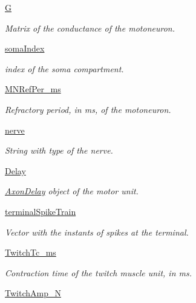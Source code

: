 \begin{DoxyCompactItemize}
\hyperlink{class_motor_unit_1_1_motor_unit_a9b9f157ab92b47470ca7ec6bd3473dd3}{G}
\begin{DoxyCompactList}\small\item\em Matrix of the conductance of the motoneuron. \end{DoxyCompactList}\item 
\hyperlink{class_motor_unit_1_1_motor_unit_a7cd2be92814b5892bdd18dafd824da9f}{soma\+Index}
\begin{DoxyCompactList}\small\item\em index of the soma compartment. \end{DoxyCompactList}\item 
\hyperlink{class_motor_unit_1_1_motor_unit_abbdaa195ac00926d96d509ae01dcda05}{M\+N\+Ref\+Per\+\_\+ms}
\begin{DoxyCompactList}\small\item\em Refractory period, in ms, of the motoneuron. \end{DoxyCompactList}\item 
\hyperlink{class_motor_unit_1_1_motor_unit_a754ee6b88fc2a09899da9f9b13bfbf59}{nerve}
\begin{DoxyCompactList}\small\item\em String with type of the nerve. \end{DoxyCompactList}\item 
\hyperlink{class_motor_unit_1_1_motor_unit_abe82ffa1e293d10225b67870a962eab8}{Delay}
\begin{DoxyCompactList}\small\item\em \hyperlink{namespace_axon_delay}{Axon\+Delay} object of the motor unit. \end{DoxyCompactList}\item 
\hyperlink{class_motor_unit_1_1_motor_unit_a2e33990aaab69454943aa00db6b8d2eb}{terminal\+Spike\+Train}
\begin{DoxyCompactList}\small\item\em Vector with the instants of spikes at the terminal. \end{DoxyCompactList}\item 
\hyperlink{class_motor_unit_1_1_motor_unit_a083581c89ebb964e58721667307dd2bc}{Twitch\+Tc\+\_\+ms}
\begin{DoxyCompactList}\small\item\em Contraction time of the twitch muscle unit, in ms. \end{DoxyCompactList}\item 
\hyperlink{class_motor_unit_1_1_motor_unit_ad14af870eb3dd7468041853f2c6e8cab}{Twitch\+Amp\+\_\+N}

\end{DoxyCompactItemize}
